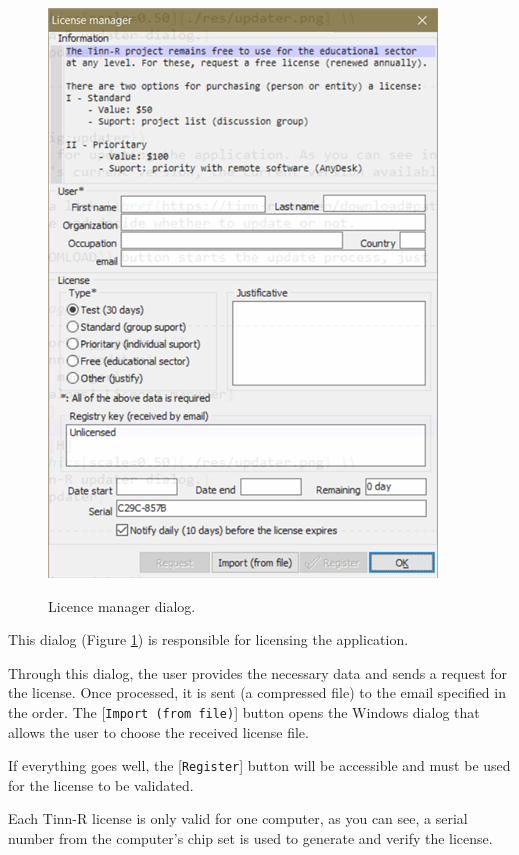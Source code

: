 \begin{figure}[H]
  \includegraphics[scale=0.50]{./res/dlg_licence_manager.png} \\
  \caption{Licence manager dialog.}
  \label{fig:dlg_license_manager}
\end{figure}
This dialog
(Figure \ref{fig:dlg_license_manager})
is responsible for licensing the application.

Through this dialog, the user provides the necessary data and sends a request for the license.
Once processed, it is sent (a compressed file) to the email specified in the order.
The [\texttt{Import (from file)}] button opens the Windows dialog that allows the user to choose
the received license file.

If everything goes well, the [\texttt{Register}] button will be accessible and must be used for
the license to be validated.

Each Tinn-R license is only valid for one computer, as you can see, a serial number from the computer's
chip set is used to generate and verify the license.


\hypertarget{dlg_ascii_chart}{}
